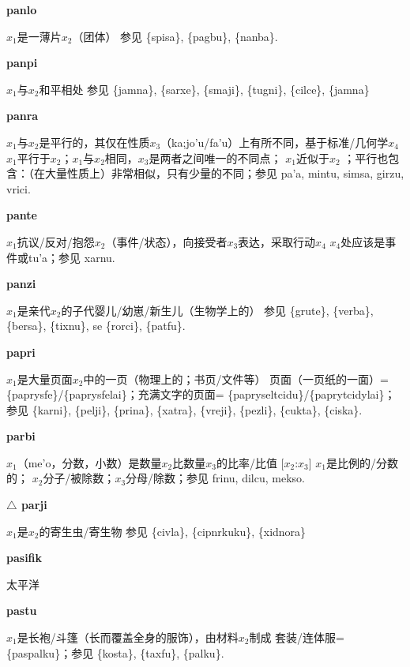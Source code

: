 \documentclass[notitlepage,twocolumn,a4paper,10pt]{book}
\begin{document}
{\sffamily\bfseries panlo}\enspace {\ttfamily\bfseries[        pa'o]}  $x_1$是一薄片$x_2$（团体） \textemdash{} 参见 \{spisa\}, \{pagbu\}, \{nanba\}.

{\sffamily\bfseries panpi}\enspace {\ttfamily\bfseries[pap]}  $x_1$与$x_2$和平相处 \textemdash{} 参见 \{jamna\}, \{sarxe\}, \{smaji\}, \{tugni\}, \{cilce\}, \{jamna\}

{\sffamily\bfseries panra} $x_1$与$x_2$是平行的，其仅在性质$x_3$（ka;jo'u\slash{}fa'u）上有所不同，基于标准\slash{}几何学$x_4$ \textemdash{} $x_1$平行于$x_2$；$x_1$与$x_2$相同，$x_3$是两者之间唯一的不同点； $x_1$近似于$x_2$ ；平行也包含：（在大量性质上）非常相似，只有少量的不同；参见 {pa'a}, {mintu}, {simsa}, {girzu}, {vrici}.

{\sffamily\bfseries pante}\enspace {\ttfamily\bfseries[pat]}  $x_1$抗议\slash{}反对\slash{}抱怨$x_2$（事件\slash{}状态），向接受者$x_3$表达，采取行动$x_4$ \textemdash{} $x_4$处应该是事件或tu'a；参见 {xarnu}.

{\sffamily\bfseries panzi}\enspace {\ttfamily\bfseries[paz]}  $x_1$是亲代$x_2$的子代婴儿\slash{}幼崽\slash{}新生儿（生物学上的） \textemdash{} 参见 \{grute\}, \{verba\}, \{bersa\}, \{tixnu\}, se \{rorci\}, \{patfu\}.

{\sffamily\bfseries papri} $x_1$是大量页面$x_2$中的一页（物理上的；书页\slash{}文件等） \textemdash{} 页面（一页纸的一面）= \{paprysfe\}\slash{}\{paprysfelai\}；充满文字的页面= \{papryseltcidu\}\slash{}\{paprytcidylai\}；参见 \{karni\}, \{pelji\}, \{prina\}, \{xatra\}, \{vreji\}, \{pezli\}, \{cukta\}, \{ciska\}.

{\sffamily\bfseries parbi}\enspace {\ttfamily\bfseries[pab]}  $x_1$（me'o，分数，小数）是数量$x_2$比数量$x_3$的比率\slash{}比值 [$x_2$:$x_3$] \textemdash{} $x_1$是比例的\slash{}分数的； $x_2$分子\slash{}被除数；$x_3$分母\slash{}除数；参见 {frinu}, {dilcu}, {mekso}.

{\sffamily\bfseries $\triangle$ parji} $x_1$是$x_2$的寄生虫\slash{}寄生物 \textemdash{} 参见 \{civla\}, \{cipnrkuku\}, \{xidnora\}

{\sffamily\bfseries pasifik} 太平洋

{\sffamily\bfseries pastu}\enspace {\ttfamily\bfseries[pas]}  $x_1$是长袍\slash{}斗篷（长而覆盖全身的服饰），由材料$x_2$制成 \textemdash{} 套装\slash{}连体服= \{paspalku\}；参见 \{kosta\}, \{taxfu\}, \{palku\}.
\end{document}
